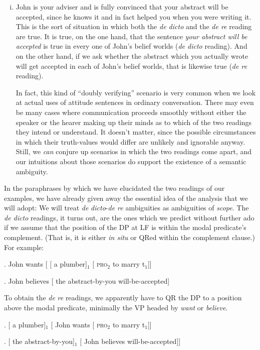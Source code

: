 \begin{enumerate}[(i)]
	\item John is your adviser and is fully convinced that your abstract will be accepted, since he knows it and in fact helped you when you were writing it. This is the sort of situation in which both the \emph{de dicto} and the \emph{de re} reading are true. It is true, on the one hand, that the sentence \emph{your abstract will be accepted} is true in every one of John's belief worlds (\emph{de dicto} reading). And on the other hand, if we ask whether the abstract which you actually wrote will get accepted in each of John's belief worlds, that is likewise true (\emph{de re} reading).
	
	In fact, this kind of ``doubly verifying'' scenario is very common when we look at actual uses of attitude sentences in ordinary conversation. There may even be many cases where communication proceeds smoothly without either the speaker or the hearer making up their minds as to which of the two readings they intend or understand. It doesn't matter, since the possible circumstances in which their truth-values would differ are unlikely and ignorable anyway. Still, we \emph{can} conjure up scenarios in which the two readings come apart, and our intuitions about those scenarios do support the existence of a semantic ambiguity.
\end{enumerate}

In the paraphrases by which we have elucidated the two readings of our examples, we have already given away the essential idea of the analysis that we will adopt: We will treat \emph{de} \emph{dicto}-\emph{de re} ambiguities as ambiguities of \emph{scope}. The \emph{de dicto} readings, it turns out, are the ones which we predict without further ado if we assume that the position of the DP at LF is within the modal predicate's complement. (That is, it is either \emph{in situ} or QRed within the complement clause.) For example:

\exi. \label{first} John wants [ [ a plumber]$_1$ [ \textsc{pro}$_2$ to marry t$_1$]]

\exi. John believes [ the abstract-by-you will-be-accepted]

To obtain the \emph{de} \emph{re} readings, we apparently have to QR the DP to a position above the modal predicate, minimally the VP headed by \emph{want} or \emph{believe}.

\exi. [ a plumber]$_1$ [ John wants [ \textsc{pro}$_2$ to marry t$_1$]]

\exi. [ the abstract-by-you]$_1$ [ John believes will-be-accepted]]

